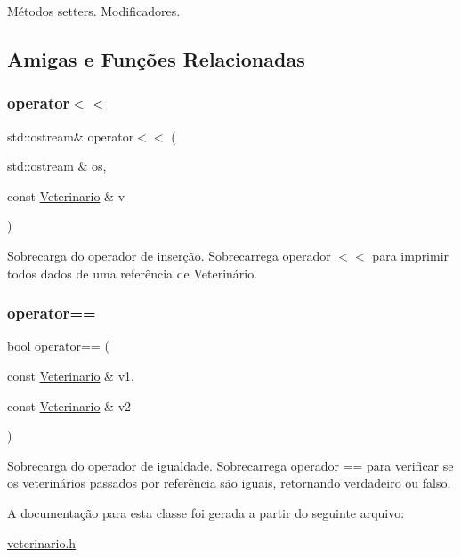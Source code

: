 Métodos setters. Modificadores. 

\subsection{Amigas e Funções Relacionadas}
\mbox{\label{classVeterinario_a48166216ec28200840169f222a7b8913}} 
\subsubsection{\texorpdfstring{operator$<$$<$}{operator<<}}
{\footnotesize\ttfamily std\+::ostream\& operator$<$$<$ (\begin{DoxyParamCaption}\item[{std\+::ostream \&}]{os,  }\item[{const \hyperlink{classVeterinario}{Veterinario} \&}]{v }\end{DoxyParamCaption})\hspace{0.3cm}{\ttfamily [friend]}}

Sobrecarga do operador de inserção. Sobrecarrega operador $<$$<$ para imprimir todos dados de uma referência de Veterinário. \mbox{\label{classVeterinario_a9de821f84b25bfc5debf622b3613302e}} 
\subsubsection{\texorpdfstring{operator==}{operator==}}
{\footnotesize\ttfamily bool operator== (\begin{DoxyParamCaption}\item[{const \hyperlink{classVeterinario}{Veterinario} \&}]{v1,  }\item[{const \hyperlink{classVeterinario}{Veterinario} \&}]{v2 }\end{DoxyParamCaption})\hspace{0.3cm}{\ttfamily [friend]}}

Sobrecarga do operador de igualdade. Sobrecarrega operador == para verificar se os veterinários passados por referência são iguais, retornando verdadeiro ou falso. 

A documentação para esta classe foi gerada a partir do seguinte arquivo\+:\begin{DoxyCompactItemize}
\item 
\hyperlink{veterinario_8h}{veterinario.\+h}\end{DoxyCompactItemize}
